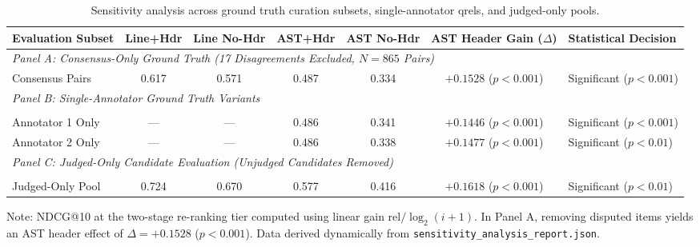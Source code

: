 \begin{table}[t]
\caption{Sensitivity analysis across ground truth curation subsets, single-annotator qrels, and judged-only pools.}
\label{tab:qrel_sensitivity}
\centering\footnotesize
\setlength{\tabcolsep}{4.5pt}
\begin{threeparttable}
\begin{tabular}{@{}lcccccl@{}}
\toprule
Evaluation Subset & Line+Hdr & Line No-Hdr & AST+Hdr & AST No-Hdr & AST Header Gain ($\Delta$) & Statistical Decision \\
\midrule
\multicolumn{7}{l}{\textit{Panel A: Consensus-Only Ground Truth (17 Disagreements Excluded, $N=865$ Pairs)}} \\[2pt]
Consensus Pairs & 0.617 & 0.571 & 0.487 & 0.334 & $+0.1528$ ($p < 0.001$) & Significant ($p < 0.001$) \\[2pt]
\midrule
\multicolumn{7}{l}{\textit{Panel B: Single-Annotator Ground Truth Variants}} \\\\[2pt]
Annotator 1 Only & --- & --- & 0.486 & 0.341 & $+0.1446$ ($p < 0.001$) & Significant ($p < 0.001$) \\[2pt]
Annotator 2 Only & --- & --- & 0.486 & 0.338 & $+0.1477$ ($p < 0.001$) & Significant ($p < 0.01$) \\[2pt]
\midrule
\multicolumn{7}{l}{\textit{Panel C: Judged-Only Candidate Evaluation (Unjudged Candidates Removed)}} \\\\[2pt]
Judged-Only Pool & 0.724 & 0.670 & 0.577 & 0.416 & $+0.1618$ ($p < 0.001$) & Significant ($p < 0.01$) \\
\bottomrule
\end{tabular}
\begin{tablenotes}\footnotesize
\item[] Note: NDCG@10 at the two-stage re-ranking tier computed using linear gain $\mathrm{rel}/\log_2(i+1)$. In Panel A, removing disputed items yields an AST header effect of $\Delta = +0.1528$ ($p < 0.001$). Data derived dynamically from \texttt{sensitivity\_analysis\_report.json}.
\end{tablenotes}
\end{threeparttable}
\end{table}